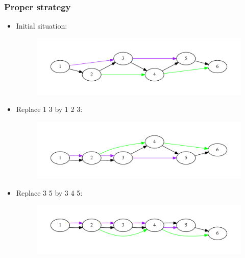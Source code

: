 \documentclass[svgnames,14pt]{beamer}
\begin{document}
\begin{frame}
\frametitle{Proper strategy}
\begin{itemize}
\item Initial situation:
\begin{changemargin}{-1.cm}{-1.cm}
\begin{figure}
\centering
\includegraphics[scale = 0.38]{graph1.pdf}
\end{figure}
\end{changemargin}
\item Replace 1 3 by 1 2 3:
\begin{changemargin}{-1.cm}{-1.cm}
\begin{figure}
\centering
\includegraphics[scale = 0.38]{graph4.pdf}
\end{figure}
\end{changemargin}
\item Replace 3 5 by 3 4 5:
\begin{changemargin}{-1.cm}{-1.cm}
\begin{figure}
\centering
\includegraphics[scale = 0.38]{graph5.pdf}
\end{figure}
\end{changemargin}
\end{itemize}
\end{frame}
\end{document}
